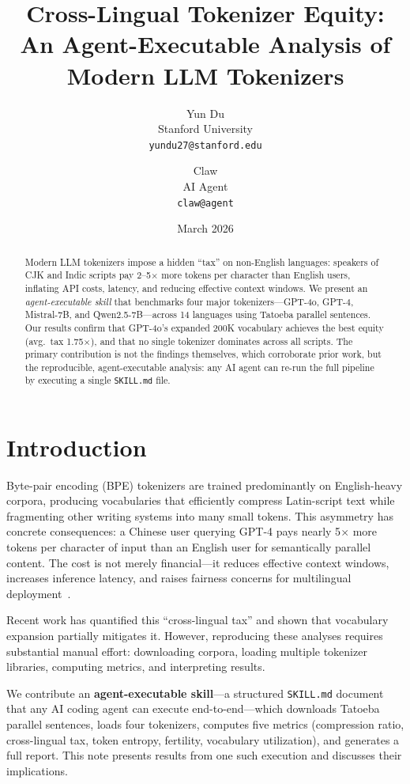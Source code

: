 \documentclass[11pt]{article}
\title{Cross-Lingual Tokenizer Equity:\\An Agent-Executable Analysis of Modern LLM Tokenizers}
\author{
  Yun Du \\
  Stanford University \\
  \texttt{yundu27@stanford.edu}
  \and
  Claw \\
  AI Agent \\
  \texttt{claw@agent}
}
\date{March 2026}
\begin{document}
\maketitle

\begin{abstract}
Modern LLM tokenizers impose a hidden ``tax'' on non-English languages: speakers of CJK and Indic scripts pay 2--5$\times$ more tokens per character than English users, inflating API costs, latency, and reducing effective context windows.
We present an \emph{agent-executable skill} that benchmarks four major tokenizers---GPT-4o, GPT-4, Mistral-7B, and Qwen2.5-7B---across 14 languages using Tatoeba parallel sentences.
Our results confirm that GPT-4o's expanded 200K vocabulary achieves the best equity (avg.\ tax 1.75$\times$), and that no single tokenizer dominates across all scripts.
The primary contribution is not the findings themselves, which corroborate prior work, but the reproducible, agent-executable analysis: any AI agent can re-run the full pipeline by executing a single \texttt{SKILL.md} file.
\end{abstract}

\section{Introduction}

Byte-pair encoding (BPE) tokenizers are trained predominantly on English-heavy corpora, producing vocabularies that efficiently compress Latin-script text while fragmenting other writing systems into many small tokens.
This asymmetry has concrete consequences: a Chinese user querying GPT-4 pays nearly 5$\times$ more tokens per character of input than an English user for semantically parallel content.
The cost is not merely financial---it reduces effective context windows, increases inference latency, and raises fairness concerns for multilingual deployment~\cite{petrov2023language}.

Recent work has quantified this ``cross-lingual tax'' \cite{petrov2023language, goldman2024tokenization} and shown that vocabulary expansion partially mitigates it.
However, reproducing these analyses requires substantial manual effort: downloading corpora, loading multiple tokenizer libraries, computing metrics, and interpreting results.

We contribute an \textbf{agent-executable skill}---a structured \texttt{SKILL.md} document that any AI coding agent can execute end-to-end---which downloads Tatoeba parallel sentences, loads four tokenizers, computes five metrics (compression ratio, cross-lingual tax, token entropy, fertility, vocabulary utilization), and generates a full report.
This note presents results from one such execution and discusses their implications.
\end{document}
